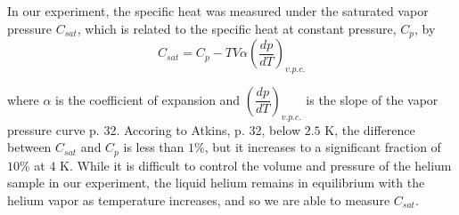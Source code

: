 In our experiment, the specific heat was measured under the saturated
vapor pressure $C_{sat}$, which is related to the specific heat at constant pressure, $C_p$, by
\begin{equation}\label{formula:cuspecificheat}
C_{sat} = C_p - TV\alpha\left(\dfrac{dp}{dT}\right)_{v.p.c.} 
\end{equation}

where $\alpha$ is the coefficient of expansion and
$\left(\dfrac{dp}{dT}\right)_{v.p.c.}$ is the slope of the vapor
pressure curve \cite{atkins} p. 32. Accoring to Atkins, p. 32, below
$2.5$ K, the difference between $C_{sat}$ and $C_p$ is less than
$1\%$, but it increases to a significant fraction of $10\%$ at $4$
K. While it is difficult to control the volume and pressure of the
helium sample in our experiment, the liquid helium remains in
equilibrium with the helium vapor as temperature increases, and so we
are able to measure $C_{sat}$.

